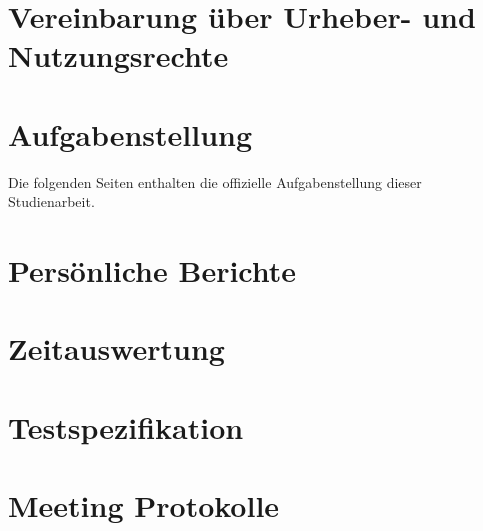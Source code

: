\documentclass[11pt,a4paper,english,oneside]{book}
\numberwithin{equation}{chapter}
\begin{document}
	\chapter{Vereinbarung über Urheber- und Nutzungsrechte}
	
	
	\chapter{Aufgabenstellung}
	\label{aufgabenstellung}
	Die folgenden Seiten enthalten die offizielle Aufgabenstellung dieser Studienarbeit.
	
    


	\chapter{Persönliche Berichte}
	\label{erfahrungsberichte}
	
	\chapter{Zeitauswertung}
	\label{zeitauswertung}
	
	\chapter{Testspezifikation}
	
	\chapter{Meeting Protokolle} \label{ch:minutes}
	
	
	
\end{document}
